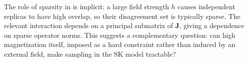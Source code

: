 \documentclass[11pt]{article}
\newcommand{\1}{\mathbf{1}}
\newcommand{\0}{\mathbf{0}}
\newcommand{\mj}{{\mathbf{J}}}
\begin{document}


The role of sparsity in \cite{BandeiraElAlaouiRodder26} is implicit: a large field strength $h$ causes
independent replicas to have high overlap, so their disagreement set is
typically sparse. The relevant
interaction depends on a principal submatrix of $\mj$, giving a dependence on sparse operator norms. This suggests a complementary question: can high magnetization itself, imposed as a hard constraint rather than induced by an external field, make sampling in the SK model tractable? 
\end{document}
